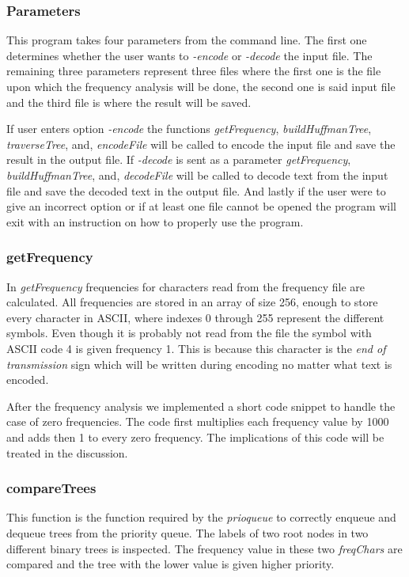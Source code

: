 \documentclass[a4paper,11pt,twoside]{article}
\begin{document}
\subsubsection{Parameters}
This program takes four parameters from the command line. The first one determines whether the 
user wants to \emph{-encode} or \emph{-decode} the input file. The remaining three parameters represent 
three files where the first one is the file upon which the frequency analysis will be done, the second one is said 
input file and the third file is where the result will be saved. 

If user enters option \emph{-encode} the functions \emph{getFrequency}, \emph{buildHuffmanTree}, \emph{traverseTree}, and, \emph{encodeFile} will be called to encode the input file and save the result in the output file. If \emph{-decode} is sent as a parameter \emph{getFrequency}, \emph{buildHuffmanTree}, and, \emph{decodeFile} will be called to decode text from the input file and save the decoded text in the output file. And lastly if the user were to give an incorrect option or if at least one file cannot be opened the program will exit with an instruction on how to properly use the program.

\subsubsection{getFrequency}
In \emph{getFrequency}  frequencies for characters read from the frequency file are calculated.
All frequencies are stored in an array of size 256, enough to store every character in ASCII, where indexes 0 through 255 
represent the different symbols. Even though it is probably not read
from the file the symbol with ASCII code 4 is given frequency 1. This
is because this character is the \emph{end of transmission} sign which
will be written during encoding no matter what text is encoded. 

After the frequency analysis we implemented a short code snippet to
handle the case of zero frequencies. The code first multiplies each
frequency value by 1000 and adds then 1 to every zero frequency. The
implications of this code will be treated in the discussion.

\subsubsection{compareTrees}
This function is the function required by the \emph{prioqueue} to correctly enqueue and dequeue trees from the priority queue.
The labels of two root nodes in two different binary trees is inspected. The frequency value in these two \emph{freqChars} are compared and the tree with the lower value is given higher priority.
\end{document}

